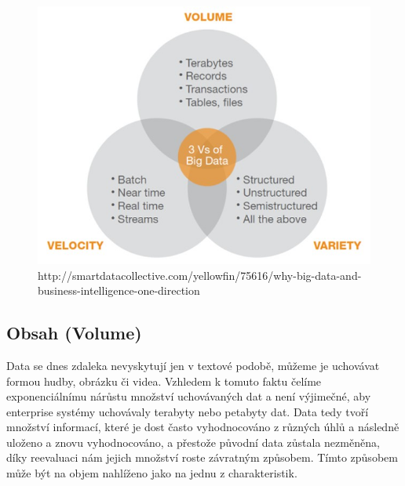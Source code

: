 \begin{figure}[h]
\centering
\includegraphics[scale=0.6]{images/3v}
\caption{http://smartdatacollective.com/yellowfin/75616/why-big-data-and-business-intelligence-one-direction}
\label{fig:3v}

\end{figure}

\subsection[3v-volume]{Obsah (Volume)}
Data se dnes zdaleka nevyskytují jen v textové podobě, můžeme je uchovávat formou hudby, obrázku či videa. Vzhledem k tomuto faktu čelíme exponenciálnímu nárůstu množství uchovávaných dat a není výjimečné, aby enterprise systémy uchovávaly terabyty nebo petabyty dat. Data tedy tvoří množství informací, které je dost často vyhodnocováno z různých úhlů a následně uloženo a znovu vyhodnocováno, a přestože původní data zůstala nezměněna, díky reevaluaci nám jejich množství roste závratným způsobem. Tímto způsobem může být na objem nahlíženo jako na jednu z charakteristik. %

